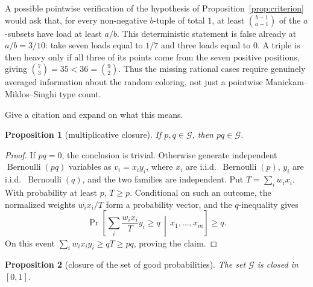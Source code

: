 \documentclass[12pt]{article}
\newtheorem{proposition}{Proposition}
\newcommand{\Ber}{\operatorname{Bernoulli}}
\newcommand{\review}[1]{\begin{reviewbox}#1\end{reviewbox}}
\begin{document}
A possible pointwise verification of the hypothesis of
Proposition~\ref{prop:criterion} would ask that, for every non-negative
\(b\)-tuple of total \(1\), at least \(\binom{b-1}{a-1}\) of the
\(a\)-subsets have load at least \(a/b\).  This deterministic statement is
false already at \(a/b=3/10\): take seven
loads equal to \(1/7\) and three loads equal to \(0\).  A triple is then heavy
only if all three of its points come from the seven positive positions, giving
\(\binom73=35<36=\binom92\).  Thus the missing rational cases require genuinely
averaged information about the random coloring, not just a pointwise
Manickam--Miklos--Singhi type count.

\review{Give a citation and expand on what this means.}

\begin{proposition}[multiplicative closure]\label{prop:closure}
If \(p,q\in\mathcal G\), then \(pq\in\mathcal G\).
\end{proposition}

\begin{proof}
If \(pq=0\), the conclusion is trivial.  Otherwise generate independent
\(\Ber(pq)\) variables as \(v_i=x_i y_i\), where
\(x_i\) are i.i.d.\ \(\Ber(p)\), \(y_i\) are i.i.d.\ \(\Ber(q)\), and the two
families are independent.  Put \(T=\sum_i w_i x_i\).  With probability at least
\(p\), \(T\ge p\).  Conditional on such an outcome, the normalized weights
\(w_i x_i/T\) form a probability vector, and the \(q\)-inequality gives
\[
 \Pr\!\left[\sum_i \frac{w_i x_i}{T}y_i\ge q\,\middle|\,x_1,\ldots,x_m\right]
 \ge q .
\]
On this event \(\sum_i w_i x_i y_i\ge qT\ge pq\), proving the claim.
\end{proof}

\begin{proposition}[closure of the set of good probabilities]\label{prop:closed}
The set \(\mathcal G\) is closed in \([0,1]\).
\end{proposition}
\end{document}
